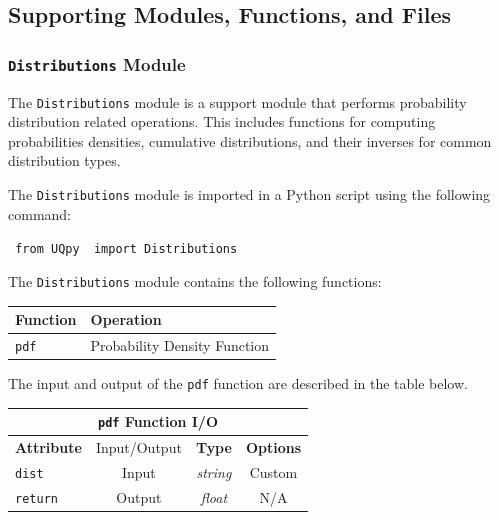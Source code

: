 \subsection{Supporting Modules, Functions, and Files}

\subsubsection{\texttt{Distributions} Module}
\label{Sec:Distributions}

The \texttt{Distributions} module is a support module that performs probability distribution related operations.  This includes functions for computing probabilities densities, cumulative distributions, and their inverses for common distribution types. 

The \texttt{Distributions} module is imported in a Python script using the following command:

\vspace{4mm}
\texttt{{\color{blue} from} \texttt{UQpy} {\color{blue} import} Distributions}
\vspace{4mm}

The \texttt{Distributions} module contains the following functions:

\vspace{4mm}
\begin{center}
	\begin{tabular}{ |l|l| } 
		\hline
		\textbf{Function} &  \textbf{Operation} \\
		\hline
		\texttt{pdf}& Probability Density Function  \\ 
		\hline
	\end{tabular}
\end{center}
\vspace{4mm}

The input and output of the \texttt{pdf} function are described in the table below.

\begin{center}
	\begin{tabular}{ |l|c|c|c| } 
				\hline
		\multicolumn{4}{|c|}{\texttt{pdf} Function I/O} \\
		\hline
		\textbf{Attribute}  & Input/Output & \textbf{Type} & \textbf{Options} \\
		\hline
		\texttt{dist} & Input & {\it string} & Custom \\ 
		\hline
		\texttt{return} & Output & {\it float} & N/A \\ 
		\hline
	\end{tabular}%
\end{center}


